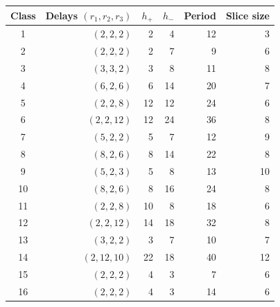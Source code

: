 \begin{tabular}{@{}crrrrr@{}}
\toprule
Class & Delays $(r_1,r_2,r_3)$ & $h_+$ & $h_-$ & Period & Slice size\\
\midrule
1 & $(2,2,2)$ & 2 & 4 & 12 & 3\\
2 & $(2,2,2)$ & 2 & 7 & 9 & 6\\
3 & $(3,3,2)$ & 3 & 8 & 11 & 8\\
4 & $(6,2,6)$ & 6 & 14 & 20 & 7\\
5 & $(2,2,8)$ & 12 & 12 & 24 & 6\\
6 & $(2,2,12)$ & 12 & 24 & 36 & 8\\
7 & $(5,2,2)$ & 5 & 7 & 12 & 9\\
8 & $(8,2,6)$ & 8 & 14 & 22 & 8\\
9 & $(5,2,3)$ & 5 & 8 & 13 & 10\\
10 & $(8,2,6)$ & 8 & 16 & 24 & 8\\
11 & $(2,2,8)$ & 10 & 8 & 18 & 6\\
12 & $(2,2,12)$ & 14 & 18 & 32 & 8\\
13 & $(3,2,2)$ & 3 & 7 & 10 & 7\\
14 & $(2,12,10)$ & 22 & 18 & 40 & 12\\
15 & $(2,2,2)$ & 4 & 3 & 7 & 6\\
16 & $(2,2,2)$ & 4 & 3 & 14 & 6\\
\bottomrule
\end{tabular}
